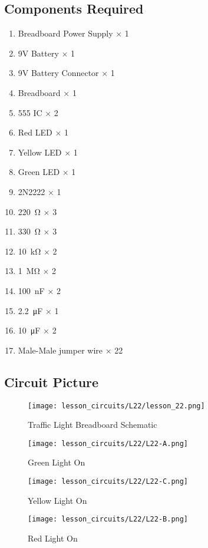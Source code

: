 \subsection{Components Required}
\begin{enumerate}
    \item Breadboard Power Supply $\times$ 1
    \item 9V Battery $\times$ 1
    \item 9V Battery Connector $\times$ 1
    \item Breadboard $\times$ 1
    \item 555 IC $\times$ 2
    \item Red LED $\times$ 1
    \item Yellow LED $\times$ 1
    \item Green LED $\times$ 1
    \item 2N2222 $\times$ 1
    \item \SI{220}{\ohm} $\times$ 3
    \item \SI{330}{\ohm} $\times$ 3
    \item \SI{10}{\kilo\ohm} $\times$ 2
    \item \SI{1}{\Mohm} $\times$ 2
    \item \SI{100}{\nano\farad} $\times$ 2
    \item \SI{2.2}{\micro\farad} $\times$ 1
    \item \SI{10}{\micro\farad} $\times$ 2
    \item Male-Male jumper wire $\times$ 22
\end{enumerate}
\subsection{Circuit Picture}
\begin{figure}[!hp]
    \centering
    \texttt{[image: lesson\_circuits/L22/lesson\_22.png]}
    \caption{Traffic Light Breadboard Schematic}
    \label{fig:555_trlight_sch}
\end{figure}
\begin{figure}[!hp]
    \centering
    \texttt{[image: lesson\_circuits/L22/L22-A.png]}
    \caption{Green Light On}
    \label{fig:555_trlight_obb}
\end{figure}
\begin{figure}[!hp]
    \centering
    \texttt{[image: lesson\_circuits/L22/L22-C.png]}
    \caption{Yellow Light On}
    \label{fig:555_trlight_obb1}
\end{figure}
\begin{figure}[!hp]
    \centering
    \texttt{[image: lesson\_circuits/L22/L22-B.png]}
    \caption{Red Light On}
    \label{fig:555_trlight_obb2}
\end{figure}
